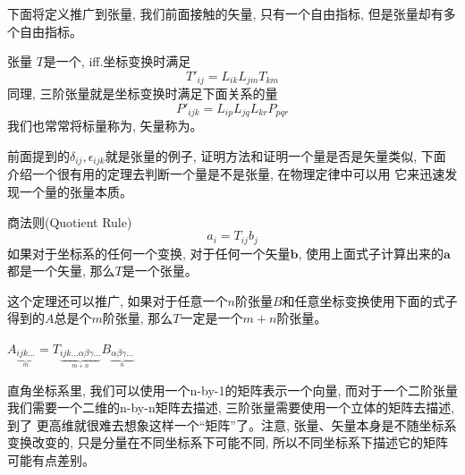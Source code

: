 下面将定义推广到张量, 我们前面接触的矢量, 只有一个自由指标, 但是张量却有多个自由指标。
\begin{define}{张量}
    $T$是一个, iff.坐标变换时满足$$T'_{ij}=L_{ik}L_{jm}T_{km}$$同理, 三阶张量就是坐标变换时满足下面关系的量$$P'_{ijk}=L_{ip}L_{jq}L_{kr}P_{pqr}$$
    我们也常常将标量称为, 矢量称为。
\end{define}
前面提到的$\delta_{ij},\epsilon_{ijk}$就是张量的例子, 证明方法和证明一个量是否是矢量类似, 下面介绍一个很有用的定理去判断一个量是不是张量, 在物理定律中可以用
它来迅速发现一个量的张量本质。
\begin{theorem}{商法则(Quotient Rule)}
    $$a_i=T_{ij}b_j$$
    如果对于坐标系的任何一个变换, 对于任何一个矢量$\bm{b}$, 使用上面式子计算出来的$\bm{a}$都是一个矢量, 那么$T$是一个张量。
    
    这个定理还可以推广, 如果对于任意一个$n$阶张量$B$和任意坐标变换使用下面的式子得到的$A$总是个$m$阶张量, 那么$T$一定是一个$m+n$阶张量。
    \begin{center}
        \begin{math}
            \displaystyle
            A_{\underbrace{ijk\ldots}_{m}}=T_{\underbrace{ijk\ldots\alpha\beta\gamma\ldots}_{m+n}}B_{\underbrace{\alpha\beta\gamma\ldots}_{n}}
        \end{math}
    \end{center}
\end{theorem}
直角坐标系里, 我们可以使用一个n-by-1的矩阵表示一个向量, 而对于一个二阶张量我们需要一个二维的n-by-n矩阵去描述, 三阶张量需要使用一个立体的矩阵去描述, 到了
更高维就很难去想象这样一个“矩阵”了。注意, 张量、矢量本身是不随坐标系变换改变的, 只是分量在不同坐标系下可能不同, 所以不同坐标系下描述它的矩阵可能有点差别。

